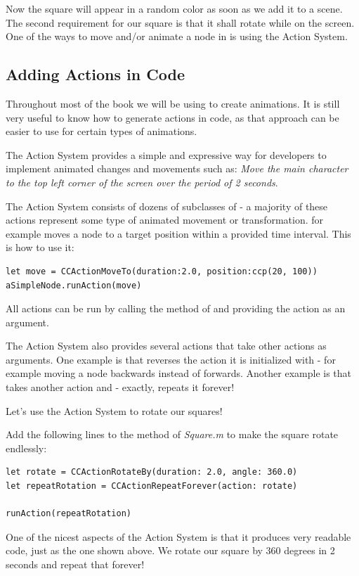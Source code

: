 Now the square will appear in a random color as soon as we add it to a scene.
The second requirement for our square is that it shall rotate while on the
screen. One of the ways to move and/or animate a node in \cocos{} is using the
\cocos{} Action System. 

\subsection{Adding Actions in Code}
Throughout most of the book we will be using \SB{} to create animations. It is
still very useful to know how to generate actions in code, as that approach can
be easier to use for certain types of animations.

The \cocos{} Action System provides a simple
and expressive way for developers to implement animated changes and
movements such as:
\textit{Move the main character to the top left corner of the screen over the
period of 2 seconds}.

The Action System consists of
dozens of subclasses of \inlinecode{\ccaction{}} - a majority of these actions represent some type of animated movement or
transformation.  for example moves a node to a
target position within a provided time interval. This is how to use it:
\begin{lstlisting}
let move = CCActionMoveTo(duration:2.0, position:ccp(20, 100))
aSimpleNode.runAction(move)
\end{lstlisting}
All actions can be run by calling the  method of \ccnode{} 
and providing the action as an argument. 

The Action System also provides several actions that take other actions as
arguments. One example is  that reverses the action
it is initialized with - for example moving a node backwards instead of
forwards. Another example is  that takes
another action and - exactly, repeats it forever!

Let's use the Action System to rotate our squares!

\begin{leftbar}
Add the following lines to the  method of \textit{Square.m}
to make the square rotate endlessly:
\begin{lstlisting}
let rotate = CCActionRotateBy(duration: 2.0, angle: 360.0)
let repeatRotation = CCActionRepeatForever(action: rotate)

runAction(repeatRotation)
\end{lstlisting}
\end{leftbar}
One of the nicest aspects of the Action System is that it produces very readable
code, just as the one shown above. We rotate our square by 360 degrees in 2
seconds and repeat that forever!

